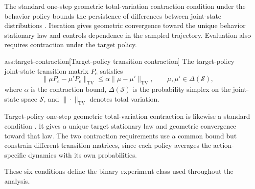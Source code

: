 The standard one-step geometric total-variation contraction condition under the behavior policy bounds the persistence of differences between joint-state distributions \citep{HuWager2023}. Iteration gives geometric convergence toward the unique behavior stationary law and controls dependence in the sampled trajectory. Evaluation also requires contraction under the target policy.

\begin{assumptionv}{ass:target-contraction}[Target-policy transition contraction]
The target-policy joint-state transition matrix \(P_e\) satisfies
\[
\|\mu P_e-\mu'P_e\|_{\mathrm{TV}}
\le
\alpha\|\mu-\mu'\|_{\mathrm{TV}},
\qquad \mu,\mu'\in\Delta(\mathcal S),
\]
where \(\alpha\) is the contraction bound, \(\Delta(\mathcal S)\) is the probability simplex on the joint-state space \(\mathcal S\), and \(\|\cdot\|_{\mathrm{TV}}\) denotes total variation.
\end{assumptionv}

Target-policy one-step geometric total-variation contraction is likewise a standard condition \citep{HuWager2023}. It gives a unique target stationary law and geometric convergence toward that law. The two contraction requirements use a common bound but constrain different transition matrices, since each policy averages the action-specific dynamics with its own probabilities.

These six conditions define the binary experiment class  used throughout the analysis.

